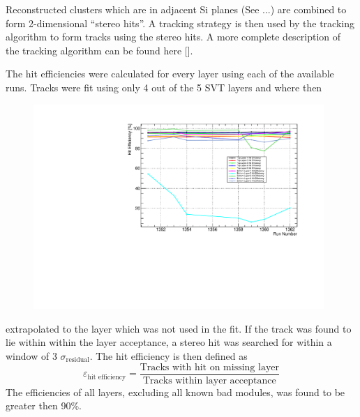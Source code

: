 
%
%
 
Reconstructed clusters which are in adjacent Si planes (See ...) are combined to 
form 2-dimensional ``stereo hits''.  A tracking strategy is then used by the 
tracking algorithm to form tracks using the stereo hits.  A more complete
description of the tracking algorithm can be found here [].  

The hit efficiencies were calculated for every layer using each of the available
runs. Tracks were fit using only 4 out of the 5 SVT layers and where then 
\begin{figure}[h]
    \begin{center}
    	\includegraphics[width=0.98\textwidth]{test2012/svtperformance/trk_performance/hit_efficiency_vs_rn.pdf}
        \caption{} 
	\label{fig:hit_efficiency}
    \end{center}
\end{figure}
extrapolated to the layer which was not used in the fit. If the track was 
found to lie within within the layer acceptance, a stereo hit was searched
for within a window of 3 $\sigma_{\mbox{residual}}$.  The hit efficiency is
then defined as
\[
    \varepsilon_{\mbox{hit efficiency}} = \frac{\mbox{Tracks with hit on missing layer}}
                                            {\mbox{Tracks within layer acceptance}}
\]
The efficiencies of all layers, excluding all known bad modules,  was found to 
be greater then 90\%.
 

